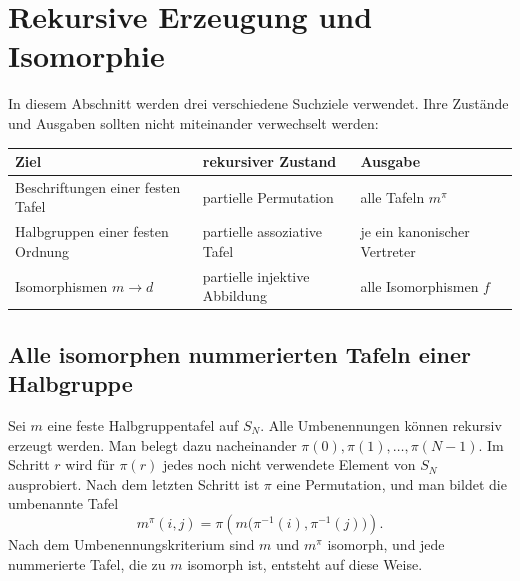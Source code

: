 \documentclass[main.tex]{subfiles}
\begin{document}
\section{Rekursive Erzeugung und Isomorphie}

In diesem Abschnitt werden drei verschiedene Suchziele verwendet.  Ihre
Zustände und Ausgaben sollten nicht miteinander verwechselt werden:
\begin{center}
\small
\begin{tabularx}{\textwidth}{@{}lXl@{}}
\toprule
\textbf{Ziel}&\textbf{rekursiver Zustand}&\textbf{Ausgabe}\\
\midrule
Beschriftungen einer festen Tafel&partielle Permutation&alle Tafeln \(m^\pi\)\\
Halbgruppen einer festen Ordnung&partielle assoziative Tafel&je ein kanonischer Vertreter\\
Isomorphismen \(m\to d\)&partielle injektive Abbildung&alle Isomorphismen \(f\)\\
\bottomrule
\end{tabularx}
\end{center}

\subsection{Alle isomorphen nummerierten Tafeln einer Halbgruppe}

Sei \(m\) eine feste Halbgruppentafel auf \(S_N\).  Alle Umbenennungen können
rekursiv erzeugt werden.  Man belegt dazu nacheinander
\(\pi(0),\pi(1),\ldots,\pi(N-1)\).  Im Schritt \(r\) wird für \(\pi(r)\)
jedes noch nicht verwendete Element von \(S_N\) ausprobiert.  Nach dem letzten
Schritt ist \(\pi\) eine Permutation, und man bildet die umbenannte Tafel
\[
  \boxed{
  m^\pi(i,j)
  =
  \pi\!\left(
    m\bigl(\pi^{-1}(i),\pi^{-1}(j)\bigr)
  \right).}
\]
Nach dem Umbenennungskriterium sind \(m\) und \(m^\pi\) isomorph, und jede
nummerierte Tafel, die zu \(m\) isomorph ist, entsteht auf diese Weise.
\end{document}
